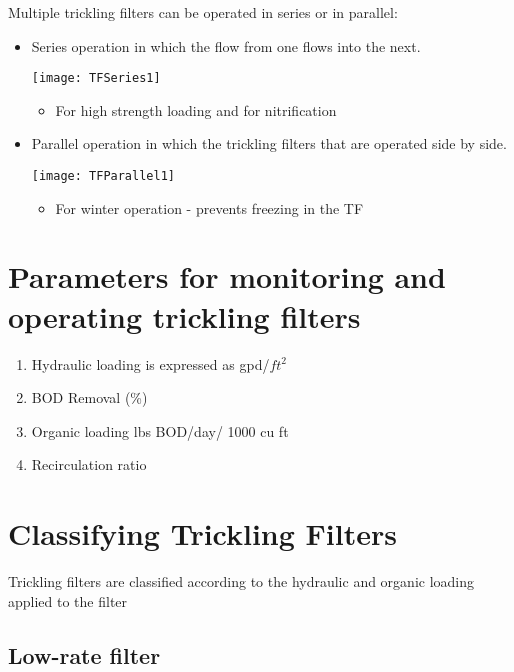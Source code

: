 Multiple trickling filters can be operated in series or in parallel:\\
\begin{itemize}
\item Series operation in which the flow from one flows into the next.
\begin{center}
\texttt{[image: TFSeries1]}
\end{center}  
\begin{itemize}
\item For high strength loading and for nitrification
\end{itemize}
\item Parallel operation in which the trickling filters that are operated side by side.
\begin{center}
\texttt{[image: TFParallel1]}
\end{center}
\begin{itemize}
\item For winter operation - prevents freezing in the TF
\end{itemize}
\end{itemize}

\section{Parameters for monitoring and operating trickling filters}



\begin{enumerate}
\item Hydraulic loading is expressed as gpd/$ft^2$
\item BOD Removal (\%)
\item Organic loading lbs BOD/day/ 1000 cu ft
\item Recirculation ratio
\end{enumerate}


\section{Classifying Trickling Filters}			
Trickling filters are classified according to the hydraulic and organic loading applied to the  filter\\

\subsection{Low-rate filter}

